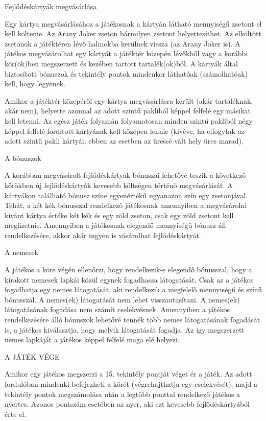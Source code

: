 Fejlődéskártyák megvásárlása\par
Egy kártya megvásárlásához a játékosnak a kártyán látható mennyiségű zsetont el kell költenie. Az Arany Joker zseton bármilyen zsetont helyettesíthet. Az elköltött zsetonok a játéktéren lévő halmokba kerülnek vissza (az Arany Joker is). A játékos megvásárolhat egy kártyát a játéktér közepén lévőkből vagy a korábbi kör(ök)ben megszerzett és kezében tartott tartalék(ok)ból. A kártyák által biztosított bónuszok és tekintély pontok mindenkor láthatóak (számolhatóak) kell, hogy legyenek.\par

Amikor a játéktér közepéről egy kártya megvásárlásra került (akár tartaléknak, akár nem), helyette azonnal az adott szintű pakliból képpel felfelé egy másikat kell letenni. Az egész játék folyamán folyamatosan minden szintű pakliból négy képpel felfelé fordított kártyának kell középen lennie (kivéve, ha elfogytak az adott szintű pakli kártyái; ebben az esetben az üressé vált hely üres marad).\par

A bónuszok\par
A korábban megvásárolt fejlődéskártyák bónuszai lehetővé teszik a következő körökben új fejlődéskártyák kevesebb költségen történő megvásárlását. A kártyákon található bónusz színe egyenértékű ugyanazon szín egy zsetonjával. Tehát, a két kék bónusszal rendelkező játékosnak amennyiben a megvásárolni kívánt kártya értéke két kék és egy zöld zseton, csak egy zöld zsetont kell megfizetnie. Amennyiben a játékosnak elegendő mennyiségű bónusz áll rendelkezésére, akkor akár ingyen is vásárolhat fejlődéskártyát.\par

A nemesek\par
A játékos a köre végén ellenőrzi, hogy rendelkezik-e elegendő bónusszal, hogy a kirakott nemesek lapkái közül egynek fogadhassa látogatását. Csak az a játékos fogadhatja egy nemes látogatását, aki rendelkezik a megfelelő mennyiségű és színű bónusszal. A nemes(ek) látogatását nem lehet visszautasítani. A nemes(ek) látogatásának fogadása nem számít cselekvésnek. Amennyiben a játékos rendelkezésére álló bónuszok lehetővé tennék több nemes látogatásának fogadását is, a játékos kiválasztja, hogy melyik látogatását fogadja. Az így megszerzett nemes lapkáját a játékos képpel felfelé maga elé helyezi.\par

A JÁTÉK VÉGE\par
Amikor egy játékos megszerzi a 15. tekintély pontját véget ér a játék. Az adott fordulóban mindenki befejezheti a körét (végrehajthatja egy cselekvését), majd a tekintély pontok megszámolása után a legtöbb ponttal rendelkező játékos a nyertes. Azonos pontszám esetében az nyer, aki ezt kevesebb fejlődéskártyából érte el.




